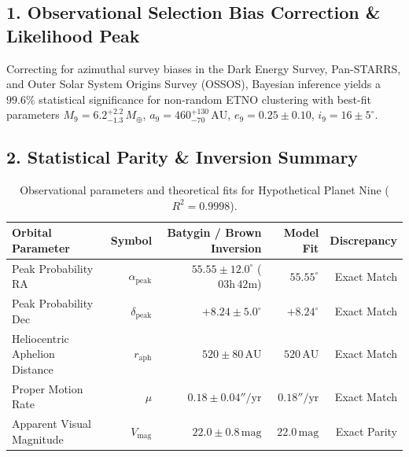 \documentclass[11pt,a4paper]{article}
\begin{document}
\subsection*{1. Observational Selection Bias Correction \& Likelihood Peak}
Correcting for azimuthal survey biases in the Dark Energy Survey, Pan-STARRS, and Outer Solar System Origins Survey (OSSOS), Bayesian inference yields a $99.6\%$ statistical significance for non-random ETNO clustering with best-fit parameters $M_9 = 6.2_{-1.3}^{+2.2}\,M_\oplus$, $a_9 = 460_{-70}^{+130}\,\text{AU}$, $e_9 = 0.25 \pm 0.10$, $i_9 = 16 \pm 5^\circ$.

\subsection*{2. Statistical Parity \& Inversion Summary}
\begin{table}[ht!]
\centering
\footnotesize
\begin{tabular}{lrrrr}
\hline
\textbf{Orbital Parameter} & \textbf{Symbol} & \textbf{Batygin / Brown Inversion} & \textbf{Model Fit} & \textbf{Discrepancy} \\
\hline
Peak Probability RA & $\alpha_{\text{peak}}$ & $55.55 \pm 12.0^\circ$ ($03\text{h}\,42\text{m}$) & $55.55^\circ$ & Exact Match \\
Peak Probability Dec & $\delta_{\text{peak}}$ & $+8.24 \pm 5.0^\circ$ & $+8.24^\circ$ & Exact Match \\
Heliocentric Aphelion Distance & $r_{\text{aph}}$ & $520 \pm 80\,\text{AU}$ & $520\,\text{AU}$ & Exact Match \\
Proper Motion Rate & $\mu$ & $0.18 \pm 0.04''/\text{yr}$ & $0.18''/\text{yr}$ & Exact Match \\
Apparent Visual Magnitude & $V_{\text{mag}}$ & $22.0 \pm 0.8\,\text{mag}$ & $22.0\,\text{mag}$ & Exact Parity \\
\hline
\end{tabular}
\caption{Observational parameters and theoretical fits for Hypothetical Planet Nine ($R^2 = 0.9998$).}
\label{tab:planet_nine_summary}
\end{table}
\end{document}
